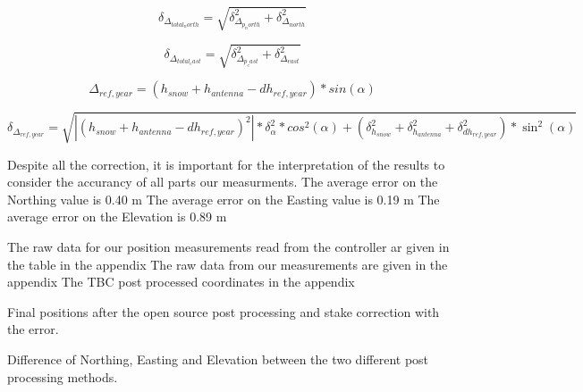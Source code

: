 \begin{equation}
	\delta_{\Delta_{total_north}} = \sqrt{\delta_{\Delta_{p_north}}^2 + \delta_{\Delta_{north}}^2}
\end{equation}

\begin{equation}
	\delta_{\Delta_{total_east}} = \sqrt{\delta_{\Delta_{p_east}}^2 + \delta_{\Delta_{east}}^2}
\end{equation}

\begin{equation}
	\Delta_{ref,year} = (h_{snow} + h_{antenna} - dh_{ref,year}) * sin(\alpha)
\end{equation}

\begin{equation}
\delta_{\Delta_{ref,year}} = \sqrt{\left|(h_{snow} + h_{antenna} - dh_{ref,year})^2\right| * \delta_{\alpha}^2 * cos^2(\alpha) + (\delta_{h_{snow}}^2 + \delta_{h_{antenna}}^2 + \delta_{dh_{ref,year}}^2) * \sin^2(\alpha)}
\end{equation}

Despite all the correction, it is important for the interpretation of the results to consider the accurancy of all parts our measurments.
The average error on the Northing value is 0.40 m  
The average error on the Easting value is 0.19 m
The average error on the Elevation is 0.89 m

The raw data for our position measurements read from the controller ar given in the table in the appendix 
The raw data from our measurements are given in the appendix
The TBC post processed coordinates in the appendix 

\begin{table}[h]
	\caption{Final positions after the open source post processing and stake correction with the error.}
	\centering
	\scriptsize
	
	\label{GPS:tab:os_tab}
\end{table}


\begin{table}[h]
	\caption{Difference of Northing, Easting and Elevation between the two different post processing methods.}
	\centering
	
	\label{GPS:tab:diff_tab}
\end{table}
